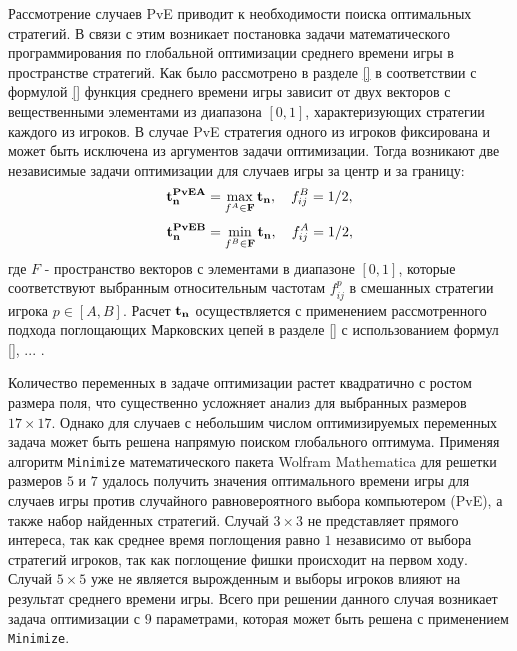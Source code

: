 Рассмотрение случаев PvE приводит к необходимости поиска оптимальных стратегий. В связи с этим возникает постановка задачи 
математического программирования по глобальной оптимизации среднего времени игры в пространстве стратегий. 
Как было рассмотрено в разделе \cref{} в соответствии с формулой \cref{} функция среднего времени игры
зависит от двух векторов с вещественными элементами из диапазона $[0, 1]$, характеризующих стратегии каждого из игроков.
В случае PvE стратегия одного из игроков фиксирована и может быть исключена из аргументов задачи оптимизации.
Тогда возникают две независимые задачи оптимизации для случаев игры за центр и за границу:
\begin{equation}
    \begin{aligned}
    {\bf t_n^{PvEA}} = \max_{f^A \in {\bf F}} {\bf t_n}, \hspace{1em} f_{ij}^B=1/2,
    \label{eq:centeropt}
    \end{aligned}
\end{equation}
\begin{equation}
    \begin{aligned}
    {\bf t_n^{PvEB}} = \min_{f^B \in {\bf F}} {\bf t_n}, \hspace{1em}  f_{ij}^A=1/2,
    \label{eq:borderopt}
    \end{aligned}
\end{equation}
где $F$ - пространство векторов с элементами в диапазоне $[0, 1]$, которые соответствуют выбранным относительным частотам $f_{ij}^p$
в смешанных стратегии игрока $p \in [A, B]$. Расчет ${\bf t_n}$ осуществляется с применением рассмотренного подхода поглощающих Марковских цепей
в разделе \cref{} с использованием формул \cref{}, ... .

Количество переменных в задаче оптимизации растет квадратично с ростом размера поля, что существенно усложняет анализ для выбранных размеров $17 \times 17$.
Однако для случаев с небольшим числом оптимизируемых переменных задача может быть решена напрямую поиском глобального оптимума.
Применяя алгоритм \texttt{Minimize} математического пакета Wolfram Mathematica для решетки размеров $5$ и $7$ удалось получить значения
оптимального времени игры для случаев игры против случайного равновероятного выбора компьютером (PvE), а также набор найденных стратегий.
Случай $3 \times 3$ не представляет прямого интереса, так как среднее время поглощения равно $1$ независимо от выбора стратегий игроков, 
так как поглощение фишки происходит на первом ходу. Случай $5 \times 5$ уже не является вырожденным и выборы игроков влияют на результат среднего времени игры.
Всего при решении данного случая возникает задача оптимизации с $9$ параметрами, которая может быть решена с применением \texttt{Minimize}.

